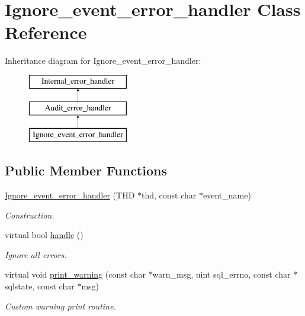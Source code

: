 \hypertarget{classIgnore__event__error__handler}{}\section{Ignore\+\_\+event\+\_\+error\+\_\+handler Class Reference}
\label{classIgnore__event__error__handler}
Inheritance diagram for Ignore\+\_\+event\+\_\+error\+\_\+handler\+:\begin{figure}[H]
\begin{center}
\leavevmode
\includegraphics[height=3.000000cm]{classIgnore__event__error__handler}
\end{center}
\end{figure}
\subsection*{Public Member Functions}
\begin{DoxyCompactItemize}
\item 
\mbox{\hyperlink{classIgnore__event__error__handler_a7eb15f1543e2afbf533f8c9b527a7f07}{Ignore\+\_\+event\+\_\+error\+\_\+handler}} (T\+HD $\ast$thd, const char $\ast$event\+\_\+name)
\begin{DoxyCompactList}\small\item\em Construction. \end{DoxyCompactList}\item 
virtual bool \mbox{\hyperlink{classIgnore__event__error__handler_a0ade890f86d2a321f78f90ed446328a6}{handle}} ()
\begin{DoxyCompactList}\small\item\em Ignore all errors. \end{DoxyCompactList}\item 
virtual void \mbox{\hyperlink{classIgnore__event__error__handler_a62ca182f5f8a5faebac36dccc8b5a01d}{print\+\_\+warning}} (const char $\ast$warn\+\_\+msg, uint sql\+\_\+errno, const char $\ast$sqlstate, const char $\ast$msg)
\begin{DoxyCompactList}\small\item\em Custom warning print routine. \end{DoxyCompactList}\end{DoxyCompactItemize}


